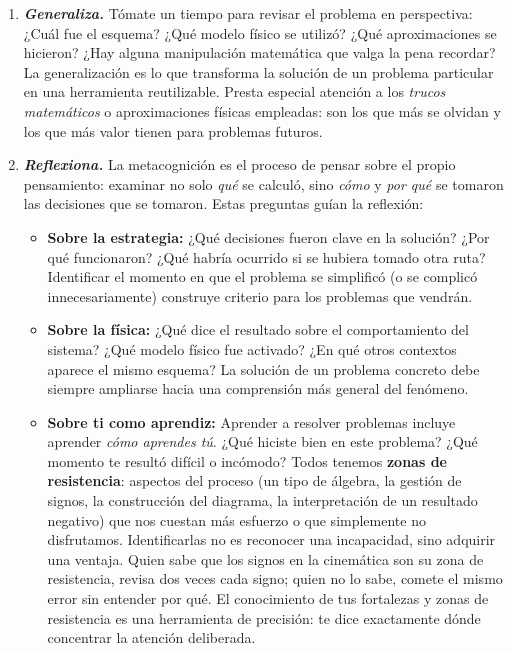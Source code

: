 \documentclass[11pt]{book}
\begin{document}
\begin{enumerate}
\begin{enumerate}
    \item[VI.] {\it\bf Generaliza.} Tómate un tiempo para revisar el problema en perspectiva: ¿Cuál fue el esquema? ¿Qué modelo físico se utilizó? ¿Qué aproximaciones se hicieron? ¿Hay alguna manipulación matemática que valga la pena recordar? La generalización es lo que transforma la solución de un problema particular en una herramienta reutilizable. Presta especial atención a los {\it trucos matemáticos} o aproximaciones físicas empleadas: son los que más se olvidan y los que más valor tienen para problemas futuros.

    \item[VII.] {\it\bf Reflexiona.} La metacognición es el proceso de pensar sobre el propio pensamiento: examinar no solo {\it qué} se calculó, sino {\it cómo} y {\it por qué} se tomaron las decisiones que se tomaron. Estas preguntas guían la reflexión:
    \begin{itemize}
        \item {\bf Sobre la estrategia:} ¿Qué decisiones fueron clave en la solución? ¿Por qué funcionaron? ¿Qué habría ocurrido si se hubiera tomado otra ruta? Identificar el momento en que el problema se simplificó (o se complicó innecesariamente) construye criterio para los problemas que vendrán.
        \item {\bf Sobre la física:} ¿Qué dice el resultado sobre el comportamiento del sistema? ¿Qué modelo físico fue activado? ¿En qué otros contextos aparece el mismo esquema? La solución de un problema concreto debe siempre ampliarse hacia una comprensión más general del fenómeno.
        \item {\bf Sobre ti como aprendiz:} Aprender a resolver problemas incluye aprender {\it cómo aprendes tú}. ¿Qué hiciste bien en este problema? ¿Qué momento te resultó difícil o incómodo? Todos tenemos {\bf zonas de resistencia}: aspectos del proceso (un tipo de álgebra, la gestión de signos, la construcción del diagrama, la interpretación de un resultado negativo) que nos cuestan más esfuerzo o que simplemente no disfrutamos. Identificarlas no es reconocer una incapacidad, sino adquirir una ventaja. Quien sabe que los signos en la cinemática son su zona de resistencia, revisa dos veces cada signo; quien no lo sabe, comete el mismo error sin entender por qué. El conocimiento de tus fortalezas y zonas de resistencia es una herramienta de precisión: te dice exactamente dónde concentrar la atención deliberada.


\end{itemize}
\end{enumerate}
\end{enumerate}
\end{document}
